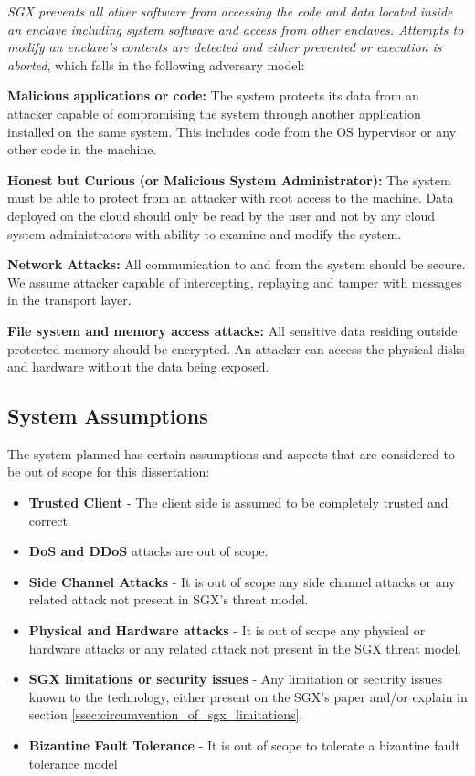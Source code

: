 \textit{SGX prevents all other software from accessing the code and data located inside an enclave including system software and access from other enclaves. Attempts to modify an enclave’s contents are detected and either prevented or execution is aborted}, \cite{sgx:7} which falls in the following adversary model:

\textbf{Malicious applications or code:} The system protects its data from an attacker capable of compromising the system through another application installed on the same system. This includes code from the \gls{OS} hypervisor or any other code in the machine.

\textbf{Honest but Curious (or Malicious System Administrator):} The system must be able to protect from an attacker with root access to the machine. Data deployed on the cloud should only be read by the user and not by any cloud system administrators with ability to examine and modify the system.

\textbf{Network Attacks:} All communication to and from the system should be secure. We assume attacker capable of intercepting, replaying and tamper with messages in the transport layer. 

\textbf{File system and memory access attacks:} All sensitive data residing outside protected memory should be encrypted. An attacker can access the physical disks and hardware without the data being exposed.

\subsection{System Assumptions}
\label{ssec:system_assumptions}

The system planned has certain assumptions and aspects that are considered to be out of scope for this dissertation:

\begin{itemize}
	\item \textbf{Trusted Client} - The client side is assumed to be completely trusted and correct.
	\item \textbf{\gls{DoS} and \gls{DDoS}} attacks are out of scope.
	\item \textbf{Side Channel Attacks} - It is out of scope any side channel attacks or any related attack not present in \gls{SGX}'s threat model.
	\item \textbf{Physical and Hardware attacks} - It is out of scope any physical or hardware attacks or any related attack not present in the \gls{SGX} threat model.
	\item \textbf{\gls{SGX} limitations or security issues} - Any limitation or security issues known to the technology, either present on the \gls{SGX}'s paper and/or explain in section \ref{ssec:circumvention_of_sgx_limitations}.
	\item \textbf{Bizantine Fault Tolerance} - It is out of scope to tolerate a bizantine fault tolerance model
\end{itemize}


